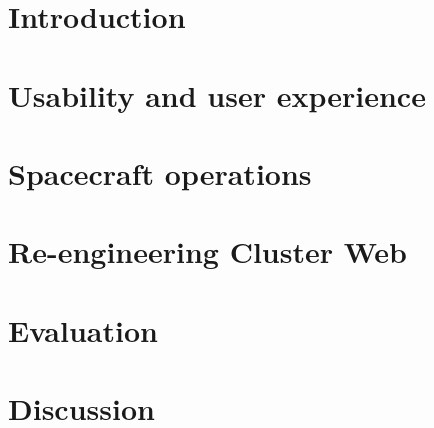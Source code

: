 \documentclass[a4paper, 12pt,titlepage]{dithesis}
\begin{document}
\chapter{Introduction}
\sivunumerot

\chapter{Usability and user experience}\label{usability_chapter}

\chapter{Spacecraft operations}\label{operations_chapter}

\chapter{Re-engineering Cluster Web}\label{cluweb_chapter}

\chapter{Evaluation}\label{evaluation_chapter}

\chapter{Discussion}\label{discussion_chapter}



\end{document}
